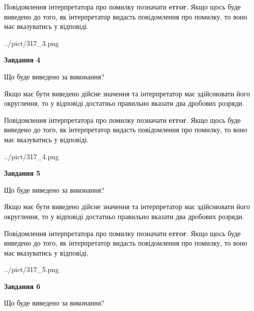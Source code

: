 \documentclass[12pt, ukrainian]{article}
\begin{document}
{\begin {Large}
Повідомлення інтерпретатора про помилку позначати \textbf{error}.
Якщо щось буде виведено до того, як інтерпретатор видасть повідомлення про помилку, 
то воно має вказуватись у відповіді. \par

\begin{center}
	{../pict/317_3.png}
\end{center}
\newpage

{\begin {center}\textbf{Завдання 4}\end {center}}\par
Що буде виведено за виконання? \par

Якщо має бути виведено дійсне значення та інтерпретатор має здійснювати його округлення, 
то у відповіді достатньо правильно вказати два дробових розряди.

Повідомлення інтерпретатора про помилку позначати \textbf{error}.
Якщо щось буде виведено до того, як інтерпретатор видасть повідомлення про помилку, 
то воно має вказуватись у відповіді. \par

\begin{center}
	{../pict/317_4.png}
\end{center}
\newpage

{\begin {center}\textbf{Завдання 5}\end {center}}\par
Що буде виведено за виконання? \par

Якщо має бути виведено дійсне значення та інтерпретатор має здійснювати його округлення, 
то у відповіді достатньо правильно вказати два дробових розряди.

Повідомлення інтерпретатора про помилку позначати \textbf{error}.
Якщо щось буде виведено до того, як інтерпретатор видасть повідомлення про помилку, 
то воно має вказуватись у відповіді. \par

\begin{center}
	{../pict/317_5.png}
\end{center}
\newpage

{\begin {center}\textbf{Завдання 6}\end {center}}\par
Що буде виведено за виконання? \par


\end{Large}}
\end{document}

